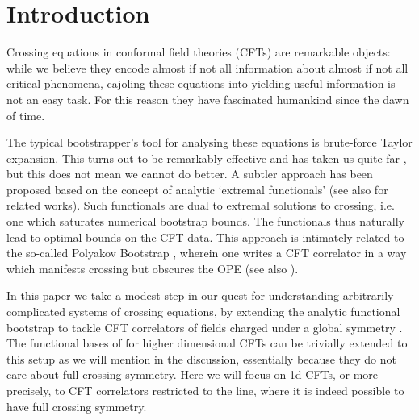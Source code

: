 \documentclass[12pt]{article}
\numberwithin{equation}{section}
\begin{document}
	
	
	\newpage
	
	{
		\setlength{\parskip}{0.05in}
		\tableofcontents
		\renewcommand{\baselinestretch}{1.0}\normalsize
	}
	
	
	\setlength{\parskip}{0.1in}
	\newpage
	
	
	
	\section{Introduction}
	Crossing equations in conformal field theories (CFTs) are remarkable objects: while we believe they encode almost if not all information about almost if not all critical phenomena, cajoling these equations into yielding useful information is not an  easy task. For this reason they have fascinated humankind since the dawn of time. 
	
	The typical bootstrapper's tool for analysing these equations is brute-force Taylor expansion. This turns out to be remarkably effective and has taken us quite far \cite{Poland:2018epd}, but this does not mean we cannot do better. A subtler approach has been proposed based on the concept of analytic `extremal functionals’ \cite{El-Showk:2016mxr, Mazac:2016qev, Mazac:2018mdx,Mazac:2018ycv} (see also \cite{Mazac:2018qmi,Mazac:2019shk,Caron-Huot:2020adz, Sinha:2020win, Gopakumar:2021dvg, Penedones:2019tng, Carmi:2020ekr,  Kaviraj:2018tfd,Mazac:2018biw,Giombi:2020xah} for related works). Such functionals are dual to extremal solutions to crossing, i.e. one which saturates numerical bootstrap bounds. The functionals thus naturally lead to optimal bounds on the CFT data. This approach is intimately related to the so-called Polyakov Bootstrap \cite{Polyakov}, wherein one  writes a CFT correlator in a way which manifests crossing but obscures the OPE \cite{Gopakumar:2016cpb, Gopakumar:2016wkt, Gopakumar:2018xqi} (see also \cite{Sen:2015doa}). 

	
	In this paper we take a modest step in our quest for understanding arbitrarily complicated systems of crossing equations, by extending the analytic functional bootstrap to tackle CFT correlators of fields charged under a global symmetry \cite{Kos:2013tga, Kos:2015mba}. The functional bases of \cite{Mazac:2019shk,Caron-Huot:2020adz} for higher dimensional CFTs can be trivially extended to this setup as we will mention in the discussion, essentially because they do not care about full crossing symmetry. Here we will focus on 1d CFTs, or more precisely, to CFT correlators restricted to the line, where it is indeed possible to have full crossing symmetry.
\end{document}
